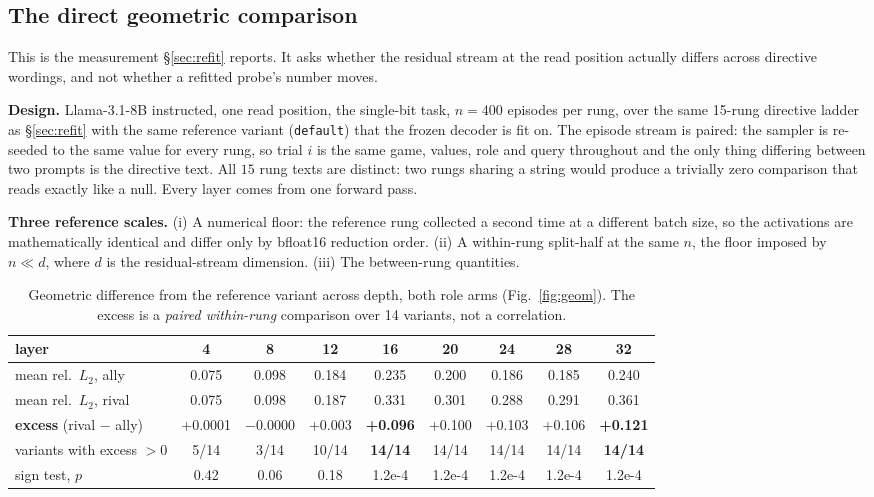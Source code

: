 \documentclass{article}
\begin{document}
\subsection{The direct geometric comparison}
\label{app:geom}

This is the measurement \S\ref{sec:refit} reports. It asks whether the residual stream at the read position
actually differs across directive wordings, and not whether a refitted probe's number moves.

\textbf{Design.} Llama-3.1-8B instructed, one read position, the single-bit task, $n{=}400$ episodes per
rung, over the same 15-rung directive ladder as \S\ref{sec:refit} with the same reference variant
(\texttt{default}) that the frozen decoder is fit on. The episode stream is paired: the sampler is
re-seeded to the same value for every rung, so trial $i$ is the same game, values, role and query
throughout and the only thing differing between two prompts is the directive text. All $15$ rung texts are
distinct: two rungs sharing a string would produce a trivially zero comparison that
reads exactly like a null. Every layer comes from one forward pass.

\textbf{Three reference scales.} (i) A numerical floor: the reference rung collected a second time at a different
batch size, so the activations are mathematically identical and differ only by bfloat16 reduction
order. (ii) A within-rung split-half at the same $n$, the floor imposed by $n \ll d$, where $d$ is the residual-stream dimension. (iii) The
between-rung quantities.

\begin{table}[h]
\centering
\caption{Geometric difference from the reference variant across depth, both role arms (Fig.~\ref{fig:geom}).
The excess is a \emph{paired within-rung} comparison over 14 variants, not a correlation.}
\label{tab:geom}
\small
\setlength{\tabcolsep}{4pt}
\begin{tabular}{lcccccccc}
\toprule
layer & 4 & 8 & 12 & 16 & 20 & 24 & 28 & 32 \\
\midrule
mean rel.\ $L_2$, ally & 0.075 & 0.098 & 0.184 & 0.235 & 0.200 & 0.186 & 0.185 & 0.240 \\
mean rel.\ $L_2$, rival & 0.075 & 0.098 & 0.187 & 0.331 & 0.301 & 0.288 & 0.291 & 0.361 \\

\textbf{excess} (rival $-$ ally) & +0.0001 & $-$0.0000 & +0.003 & \textbf{+0.096} & +0.100 & +0.103 & +0.106 & \textbf{+0.121} \\
variants with excess $>0$ & 5/14 & 3/14 & 10/14 & \textbf{14/14} & 14/14 & 14/14 & 14/14 & \textbf{14/14} \\
sign test, $p$ & 0.42 & 0.06 & 0.18 & 1.2e-4 & 1.2e-4 & 1.2e-4 & 1.2e-4 & 1.2e-4 \\
\bottomrule
\end{tabular}
\end{table}
\end{document}
